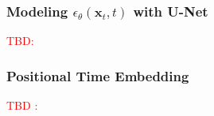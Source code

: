 \documentclass[11pt]{article}
\begin{document}
    \subsubsection{Modeling $\epsilon_{\theta}(\mathbf{x}_t,t)$ with U-Net}
    \textcolor{red}{TBD: \cite{ho2020denoising,sohldickstein2015deep_diffusion_model_main_paper}}

    \subsubsection{Positional Time Embedding}\label{subsubsec:positional-time-encoding}
    \textcolor{red}{TBD : \cite{Demystif18:online,AGentleI11:online,vaswani2023attention}}
\end{document}
